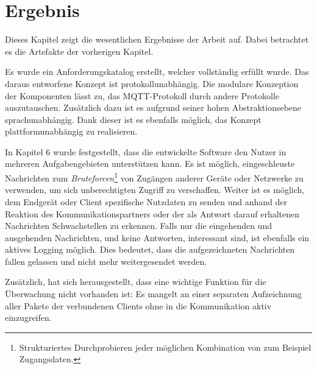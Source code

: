 \chapter{Ergebnis}
Dieses Kapitel zeigt die wesentlichen Ergebnisse der Arbeit auf. Dabei betrachtet es die Artefakte der vorherigen Kapitel.

Es wurde ein Anforderungskatalog erstellt, welcher vollständig erfüllt wurde.
Das daraus entworfene Konzept ist protokollunabhängig. Die modulare Konzeption der Komponenten lässt zu, das \ac{MQTT}-Protokoll durch andere Protokolle auszutauschen. Zusätzlich dazu ist es aufgrund seiner hohen Abstraktionsebene sprachunabhängig. Dank dieser ist es ebenfalls möglich, das Konzept plattformunabhängig zu realisieren.

In Kapitel 6 wurde festgestellt, dass die entwickelte Software den Nutzer in mehreren Aufgabengebieten unterstützen kann.
Es ist möglich, eingeschleuste Nachrichten zum \emph{Bruteforcen}\footnote{Strukturiertes Durchprobieren jeder möglichen Kombination von zum Beispiel Zugangsdaten.} von Zugängen anderer Geräte oder Netzwerke zu verwenden, um sich unberechtigten Zugriff zu verschaffen.
Weiter ist es möglich, dem Endgerät oder Client spezifische Nutzdaten zu senden und anhand der Reaktion des Kommunikationspartners oder der als Antwort darauf  erhaltenen Nachrichten Schwachstellen zu erkennen.
Falls nur die eingehenden und ausgehenden Nachrichten, und keine Antworten, interessant sind, ist ebenfalls ein aktives Logging möglich. Dies bedeutet, dass die aufgezeichneten Nachrichten fallen gelassen und nicht mehr weitergesendet werden.

Zusätzlich, hat sich herausgestellt, dass eine wichtige Funktion für die Überwachung nicht vorhanden ist: Es mangelt an einer separaten Aufzeichnung aller Pakete der verbundenen Clients ohne in die Kommunikation aktiv einzugreifen.
